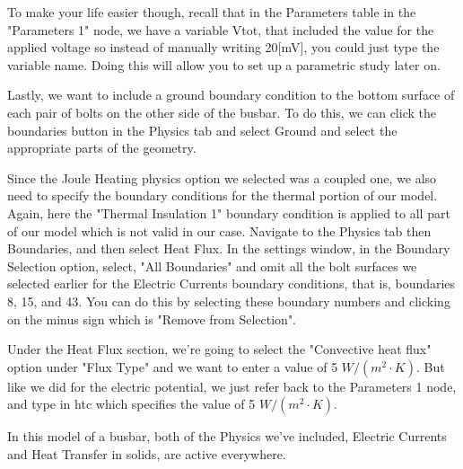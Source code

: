 To make your life easier though, recall that in the Parameters table in the "Parameters 1" node, we have a variable Vtot, that included the value for the applied voltage so instead of manually writing 20[mV], you could just type the variable name. Doing this will allow you to set up a parametric study later on.

Lastly, we want to include a ground boundary condition to the bottom surface of each pair of bolts on the other side of the busbar. To do this, we can click the boundaries button in the Physics tab and select Ground and select the appropriate parts of the geometry.


Since the Joule Heating physics option we selected was a coupled one, we also need to specify the boundary conditions for the thermal portion of our model. Again, here the "Thermal Insulation 1" boundary condition is applied to all part of our model which is not valid in our case. Navigate to the Physics tab then Boundaries, and then select Heat Flux. In the settings window, in the Boundary Selection option, select, "All Boundaries" and omit all the bolt surfaces we selected earlier for the Electric Currents boundary conditions, that is, boundaries 8, 15, and 43. You can do this by selecting these boundary numbers and clicking on the minus sign which is "Remove from Selection".

Under the Heat Flux section, we're going to select the "Convective heat flux" option under "Flux Type" and we want to enter a value of 5 $W/(m^2\cdot K)$. But like we did for the electric potential, we just refer back to the Parameters 1 node, and type in htc which specifies the value of 5 $W/(m^2\cdot K)$.


In this model of a busbar, both of the Physics we've included, Electric Currents and Heat Transfer in solids, are active everywhere.

